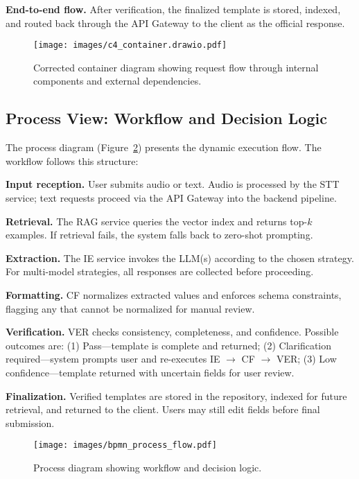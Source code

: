 \textbf{End-to-end flow.} After verification, the finalized template is stored, indexed, and routed back through the API Gateway to the client as the official response.

\begin{figure}[H]
  \centering
  \texttt{[image: images/c4\_container.drawio.pdf]}
  \caption{Corrected container diagram showing request flow through internal components and external dependencies.}
  \label{fig:c4-container}
\end{figure}

\subsection{Process View: Workflow and Decision Logic}
\label{subsec:process-view}

The process diagram (Figure~\ref{fig:bpmn}) presents the dynamic execution flow. The workflow follows this structure:

\textbf{Input reception.} User submits audio or text. Audio is processed by the STT service; text requests proceed via the API Gateway into the backend pipeline.

\textbf{Retrieval.} The RAG service queries the vector index and returns top-$k$ examples. If retrieval fails, the system falls back to zero-shot prompting.

\textbf{Extraction.} The IE service invokes the LLM(s) according to the chosen strategy. For multi-model strategies, all responses are collected before proceeding.

\textbf{Formatting.} CF normalizes extracted values and enforces schema constraints, flagging any that cannot be normalized for manual review.

\textbf{Verification.} VER checks consistency, completeness, and confidence. Possible outcomes are: (1) Pass—template is complete and returned; (2) Clarification required—system prompts user and re-executes IE $\rightarrow$ CF $\rightarrow$ VER; (3) Low confidence—template returned with uncertain fields for user review.

\textbf{Finalization.} Verified templates are stored in the repository, indexed for future retrieval, and returned to the client. Users may still edit fields before final submission.

\begin{figure}[H]
  \centering
  \texttt{[image: images/bpmn\_process\_flow.pdf]}
  \caption{Process diagram showing workflow and decision logic.}
  \label{fig:bpmn}
\end{figure}
